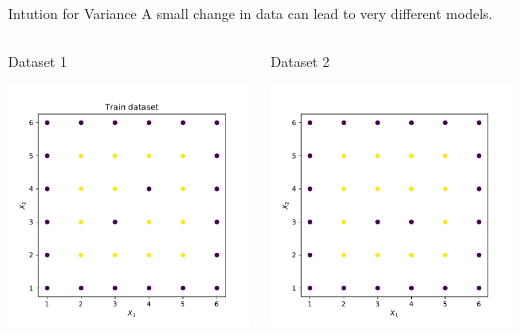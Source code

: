 \documentclass{beamer}
\begin{document}
	\begin{frame}{Intution for Variance}
	A small change in data can lead to very different models.\\
	\vspace{1cm}
	\begin{columns}
		\begin{column}{0.5\textwidth}{\hspace{1.75cm} Dataset 1}
			\begin{center}
			\includegraphics[width = \textwidth]{dataset-2-train}
			\end{center}
		\end{column}
		\begin{column}{0.5\textwidth}{\hspace{1.75cm} Dataset 2}
			\begin{center}
			\includegraphics[width = \textwidth]{dataset-2-train-var}

\end{center}
\end{column}
\end{columns}
\end{frame}
\end{document}
